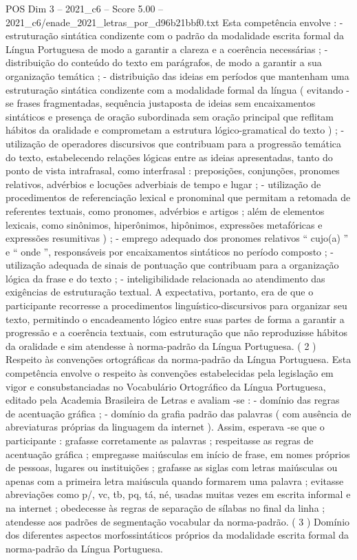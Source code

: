 \begin{textsample}{POS Dim 3 – 2021\_c6 – Score 5.00 – 2021\_c6/enade\_2021\_letras\_por\_d96b21bbf0.txt}
Esta competência envolve : - estruturação sintática condizente com o padrão da modalidade escrita formal da Língua Portuguesa de modo a garantir a clareza e a coerência necessárias ; - distribuição do conteúdo do texto em parágrafos, de modo a garantir a sua organização temática ; - distribuição das ideias em períodos que mantenham uma estruturação sintática condizente com a modalidade formal da língua ( evitando -se frases fragmentadas, sequência justaposta de ideias sem encaixamentos sintáticos e presença de oração subordinada sem oração principal que reflitam hábitos da oralidade e comprometam a estrutura lógico-gramatical do texto ) ; - utilização de operadores discursivos que contribuam para a progressão temática do texto, estabelecendo relações lógicas entre as ideias apresentadas, tanto do ponto de vista intrafrasal, como interfrasal : preposições, conjunções, pronomes relativos, advérbios e locuções adverbiais de tempo e lugar ; - utilização de procedimentos de referenciação lexical e pronominal que permitam a retomada de referentes textuais, como pronomes, advérbios e artigos ; além de elementos lexicais, como sinônimos, hiperônimos, hipônimos, expressões metafóricas e expressões resumitivas ) ; - emprego adequado dos pronomes relativos “ cujo(a) ” e “ onde ”, responsáveis por encaixamentos sintáticos no período composto ; - utilização adequada de sinais de pontuação que contribuam para a organização lógica da frase e do texto ; - inteligibilidade relacionada ao atendimento das exigências de estruturação textual.
A expectativa, portanto, era de que o participante recorresse a procedimentos linguístico-discursivos para organizar seu texto, permitindo o encadeamento lógico entre suas partes de forma a garantir a progressão e a coerência textuais, com estruturação que não reproduzisse hábitos da oralidade e sim atendesse à norma-padrão da Língua Portuguesa. ( 2 ) Respeito às convenções ortográficas da norma-padrão da Língua Portuguesa.
Esta competência envolve o respeito às convenções estabelecidas pela legislação em vigor e consubstanciadas no Vocabulário Ortográfico da Língua Portuguesa, editado pela Academia Brasileira de Letras e avaliam -se : - domínio das regras de acentuação gráfica ; - domínio da grafia padrão das palavras ( com ausência de abreviaturas próprias da linguagem da internet ).
Assim, esperava -se que o participante : grafasse corretamente as palavras ; respeitasse as regras de acentuação gráfica ; empregasse maiúsculas em início de frase, em nomes próprios de pessoas, lugares ou instituições ; grafasse as siglas com letras maiúsculas ou apenas com a primeira letra maiúscula quando formarem uma palavra ; evitasse abreviações como p/, vc, tb, pq, tá, né, usadas muitas vezes em escrita informal e na internet ; obedecesse às regras de separação de sílabas no final da linha ; atendesse aos padrões de segmentação vocabular da norma-padrão. ( 3 ) Domínio dos diferentes aspectos morfossintáticos próprios da modalidade escrita formal da norma-padrão da Língua Portuguesa.

\end{textsample}
